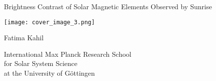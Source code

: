 \documentclass{article}
\begin{document}
\pagestyle{empty}

\null\vspace{-5cm}

\hspace*{-1.2cm}\colorbox{bcol}{\parbox[b][22cm][c]{15.2cm}{\null\hfill}}

\vspace{-19.4cm}

\hspace*{5mm}\begin{minipage}[t][17.5cm]{12cm}

\begin{center}

\fontsize{25}{30}\selectfont%

\textcolor{tcol}{Brightness Contrast of Solar Magnetic Elements Observed by Sunrise}%

\vspace{1.8cm}

\colorbox{fcol}{\parbox[b][64.4mm][c]{80.3mm}{\hspace{2mm}\texttt{[image: cover\_image\_3.png]}}}%

\vspace{1.5cm}

\textcolor{tcol}{Fatima Kahil}%

\vfill

\fontsize{12}{15}\selectfont%

\textcolor{scol}{International Max Planck Research School\\ for Solar System Science\\ at the University of G\"ottingen}

\end{center}

\end{minipage}
\end{document}
